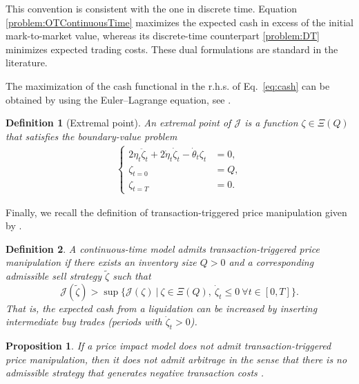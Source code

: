 \documentclass[final,3p,authoryear,12pt]{elsarticle}
\newtheorem{definition}{Definition}
\newtheorem{proposition}{Proposition}
\begin{document}
This convention is consistent with the one in discrete time.
Equation \eqref{problem:OTContinuousTime} maximizes the expected cash in
excess of the initial mark-to-market value, whereas its discrete-time
counterpart \eqref{problem:DT} minimizes expected trading costs. These
dual formulations are standard in the literature.

The maximization of the cash functional in the r.h.s. of
Eq.~\eqref{eq:cash} can be obtained by using the Euler–Lagrange equation,
see \cite{gueant2016financial}.
\begin{definition}[Extremal point]
\label{def:extremal_point}
An extremal point of $\mathcal{J}$ is a function $\zeta\in\Xi(Q)$ that satisfies
the boundary-value problem
\begin{align}
    \label{eq:extremal_point_BVP}
    \begin{cases}
        2\eta_t \ddot \zeta_t+2\dot \eta_t\dot \zeta_t-\dot \theta_t\zeta_t&=0, \\
        \zeta_{t=0}&=Q,\\
        \zeta_{t=T}&=0.
    \end{cases}
\end{align}
\end{definition}


Finally, we recall the definition of transaction-triggered price manipulation given by \cite{alfonsi2012order}.

\begin{definition}
\label{definition:TTPMcont}
A continuous-time model admits transaction-triggered price manipulation if
there exists an inventory size $Q>0$ and a corresponding admissible sell
strategy $\tilde \zeta$ such that
\[
\mathcal{J}(\tilde{\zeta}) >
\sup \Big\{ \mathcal{J}(\zeta)\ \big|\ \zeta\in\Xi(Q),\ \dot \zeta_t \le 0\
\forall t\in[0,T]\Big\}.
\]
That is, the expected cash from a liquidation can be increased by inserting
intermediate buy trades (periods with $\dot\zeta_t>0$).
\end{definition}



\begin{proposition}
    \label{proposition:NoPTPimpliesNOPM}
     If a price impact model does not admit transaction-triggered price manipulation, then it does not admit arbitrage in the sense that there is no admissible strategy that generates negative transaction costs \cite{alfonsi2010optimal}.
\end{proposition}
\end{document}
